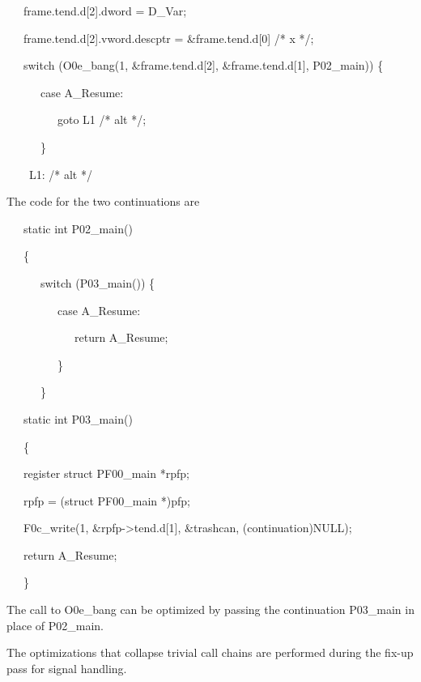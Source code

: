 {\ttfamily\mdseries
\ \ \ frame.tend.d[2].dword = D\_Var;}

{\ttfamily\mdseries
\ \ \ frame.tend.d[2].vword.descptr = \&frame.tend.d[0] /* x */;}


\bigskip

{\ttfamily\mdseries
\ \ \ switch (O0e\_bang(1, \&frame.tend.d[2], \&frame.tend.d[1], P02\_main)) \{}

{\ttfamily\mdseries
\ \ \ \ \ \ case A\_Resume:}

{\ttfamily\mdseries
\ \ \ \ \ \ \ \ \ goto L1 /* alt */;}

{\ttfamily\mdseries
\ \ \ \ \ \ \}}

{\ttfamily\mdseries
\ \ \ \ L1: /* alt */}


The code for the two continuations are 

{\ttfamily\mdseries
\ \ \ static int P02\_main()}

{\ttfamily\mdseries
\ \ \ \{}

{\ttfamily\mdseries
\ \ \ \ \ \ switch (P03\_main()) \{}

{\ttfamily\mdseries
\ \ \ \ \ \ \ \ \ case A\_Resume:}

{\ttfamily\mdseries
\ \ \ \ \ \ \ \ \ \ \ \ return A\_Resume;}

{\ttfamily\mdseries
\ \ \ \ \ \ \ \ \ \}}

{\ttfamily\mdseries
\ \ \ \ \ \ \}}


\bigskip

{\ttfamily\mdseries
\ \ \ static int P03\_main()}

{\ttfamily\mdseries
\ \ \ \{}

{\ttfamily\mdseries
\ \ \ register struct PF00\_main *rpfp;}


\bigskip

{\ttfamily\mdseries
\ \ \ rpfp = (struct PF00\_main *)pfp;}

{\ttfamily\mdseries
\ \ \ F0c\_write(1, \&rpfp-{\textgreater}tend.d[1], \&trashcan, (continuation)NULL);}

{\ttfamily\mdseries
\ \ \ return A\_Resume;}

{\ttfamily\mdseries
\ \ \ \}}

The call to O0e\_bang can be optimized by passing the continuation
P03\_main in place of P02\_main.

The optimizations that collapse trivial call chains are performed
during the fix-up pass for signal handling.

